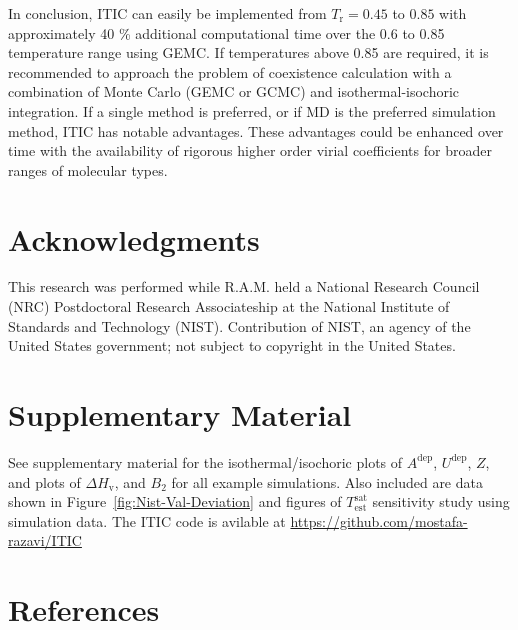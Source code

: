 \documentclass[5p,times]{elsarticle}
\begin{document}
In conclusion, ITIC can easily be implemented from $T_\mathrm{r} = 0.45$ to $0.85$ with approximately 40 \% additional computational time over the 0.6 to 0.85 temperature range using GEMC. If temperatures above 0.85 are required, it is recommended to approach the problem of coexistence calculation with a combination of Monte Carlo (GEMC or GCMC) and isothermal-isochoric integration. If a single method is preferred, or if MD is the preferred simulation method, ITIC has notable advantages. These advantages could be enhanced over time with the availability of rigorous higher order virial coefficients for broader ranges of molecular types. 

\section{Acknowledgments}

This research was performed while R.A.M. held a National Research Council (NRC) Postdoctoral Research Associateship at the National Institute of Standards and Technology (NIST). Contribution of NIST, an agency of the United States government; not subject to copyright in the United States.

\section{Supplementary Material} \label{sec:SupMat} 
See supplementary material for 
the isothermal/isochoric plots of $A^{\mathrm{dep}}$, $U^{\mathrm{dep}}$, $Z$, and plots of $\Delta H_{\mathrm{v}}$, and $B_2$ for all example simulations. Also included are data shown in Figure~\ref{fig:Nist-Val-Deviation} and figures of $T^\mathrm{sat}_\mathrm{est}$ sensitivity study using simulation data. The ITIC code is avilable at \url{https://github.com/mostafa-razavi/ITIC}


\section{References} \label{sec:ref} 



\end{document}
